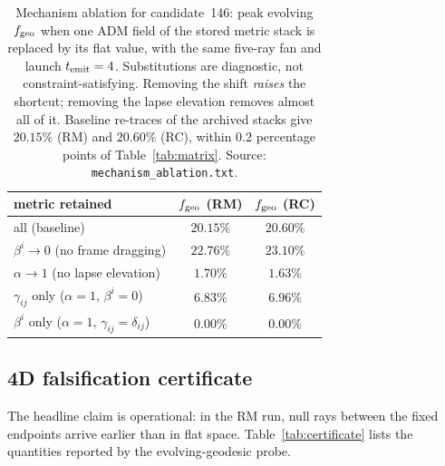 \documentclass[twocolumn,floatfix,aps,prd,nofootinbib]{revtex4-2}
\begin{document}
\begin{table}[tbp]
\caption{Mechanism ablation for candidate~146: peak evolving $f_{\rm geo}$
when one ADM field of the stored metric stack is replaced by its flat value,
with the same five-ray fan and launch $t_{\rm emit}=4$. Substitutions are
diagnostic, not constraint-satisfying. Removing the shift \emph{raises} the
shortcut; removing the lapse elevation removes almost all of it. Baseline
re-traces of the archived stacks give $20.15\%$ (RM) and $20.60\%$ (RC),
within $0.2$ percentage points of Table~\ref{tab:matrix}.
Source: \texttt{mechanism\_ablation.txt}.}
\label{tab:mechanism_ablation}
\begin{ruledtabular}
\begin{tabular}{lcc}
metric retained & $f_{\rm geo}$ (RM) & $f_{\rm geo}$ (RC) \\
\hline
all (baseline)                                   & $20.15\%$ & $20.60\%$ \\
$\beta^i\to0$ (no frame dragging)                & $22.76\%$ & $23.10\%$ \\
$\alpha\to1$ (no lapse elevation)                & $1.70\%$  & $1.63\%$  \\
$\gamma_{ij}$ only ($\alpha=1$, $\beta^i=0$)     & $6.83\%$  & $6.96\%$  \\
$\beta^i$ only ($\alpha=1$, $\gamma_{ij}=\delta_{ij}$) & $0.00\%$ & $0.00\%$ \\
\end{tabular}
\end{ruledtabular}
\end{table}

\subsection{4D falsification certificate}

The headline claim is operational: in the RM run, null rays between the fixed
endpoints arrive earlier than in flat space. Table~\ref{tab:certificate}
lists the quantities reported by the evolving-geodesic probe.
\end{document}

